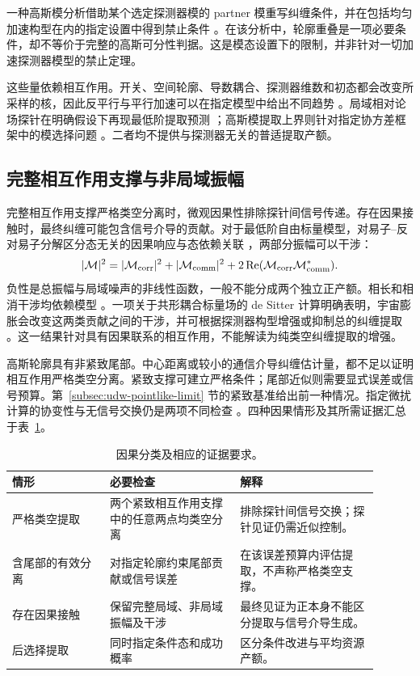 \documentclass[UTF8,11pt,a4paper,fontset=none]{ctexart}
\begin{document}
一种高斯模分析借助某个选定探测器模的 partner 模重写纠缠条件，并在包括均匀加速构型在内的指定设置中得到禁止条件 \cite{OsawaNambuYoshimoto2026}。在该分析中，轮廓重叠是一项必要条件，却不等价于完整的高斯可分性判据。这是模态设置下的限制，并非针对一切加速探测器模型的禁止定理。

这些量依赖相互作用。开关、空间轮廓、导数耦合、探测器维数和初态都会改变所采样的核，因此反平行与平行加速可以在指定模型中给出不同趋势 \cite{SaltonMannMenicucci2015}。局域相对论场探针在明确假设下再现最低阶提取预测 \cite{Perche2024}；高斯模提取上界则针对指定协方差框架中的模选择问题 \cite{Torres2023}。二者均不提供与探测器无关的普适提取产额。

\subsection{完整相互作用支撑与非局域振幅}
完整相互作用支撑严格类空分离时，微观因果性排除探针间信号传递。存在因果接触时，最终纠缠可能包含信号介导的贡献。对于最低阶自由标量模型，对易子--反对易子分解区分态无关的因果响应与态依赖关联 \cite{Tjoa2021}，两部分振幅可以干涉：
\begin{equation}
|\mathcal M|^2=|\mathcal M_{\rm corr}|^2+|\mathcal M_{\rm comm}|^2
+2\operatorname{Re}(\mathcal M_{\rm corr}\mathcal M_{\rm comm}^*).
\label{eq:harvesting-communication-interference}
\end{equation}
负性是总振幅与局域噪声的非线性函数，一般不能分成两个独立正产额。相长和相消干涉均依赖模型 \cite{Zambianco2024,Zambianco2026}。一项关于共形耦合标量场的 de Sitter 计算明确表明，宇宙膨胀会改变这两类贡献之间的干涉，并可根据探测器构型增强或抑制总的纠缠提取 \cite{Zambianco2024,Zambianco2026}。这一结果针对具有因果联系的相互作用，不能解读为纯类空纠缠提取的增强。

高斯轮廓具有非紧致尾部。中心距离或较小的通信介导纠缠估计量，都不足以证明相互作用严格类空分离。紧致支撑可建立严格条件；尾部近似则需要显式误差或信号预算。第~\ref{subsec:udw-pointlike-limit} 节的紧致基准给出前一种情况。指定微扰计算的协变性与无信号交换仍是两项不同检查 \cite{MaesoGarcia2022}。四种因果情形及其所需证据汇总于表~\ref{tab:causal-attribution}。

\begin{table}[htbp]
\centering\small
\caption{因果分类及相应的证据要求。}
\label{tab:causal-attribution}
\begin{tabular}{p{0.24\linewidth}p{0.32\linewidth}p{0.34\linewidth}}
\toprule
情形 & 必要检查 & 解释\\
\midrule
严格类空提取 & 两个紧致相互作用支撑中的任意两点均类空分离 & 排除探针间信号交换；探针见证仍需近似控制。\\
含尾部的有效分离 & 对指定轮廓约束尾部贡献或信号误差 & 在该误差预算内评估提取，不声称严格类空支撑。\\
存在因果接触 & 保留完整局域、非局域振幅及干涉 & 最终见证为正本身不能区分提取与信号介导生成。\\
后选择提取 & 同时指定条件态和成功概率 & 区分条件改进与平均资源产额。\\
\bottomrule
\end{tabular}
\end{table}
\end{document}
